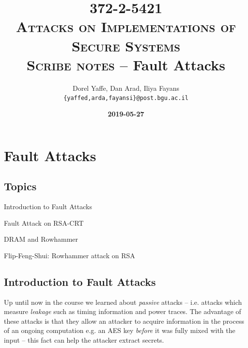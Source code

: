 \chapter{Fault Attacks} \label{c9_ninthchapter:cha}

\makeatletter
\let\oldabs\abs
\def\abs{\@ifstar{\oldabs}{\oldabs*}}
%
\let\oldnorm\norm
\def\norm{\@ifstar{\oldnorm}{\oldnorm*}}
\makeatother

\title{
    {\large 372-2-5421} \\
    {\large \textsc{Attacks on Implementations of Secure Systems}} \\
    \vspace{20pt}
    \textbf{\textsc{Scribe notes} -- Fault Attacks}
}
\author{
    \parbox{\linewidth}{\centering
    Dorel Yaffe, Dan Arad, Iliya Fayans \\
    \vspace{7pt}\texttt{\small{\{yaffed,arda,fayansi\}@post.bgu.ac.il}}
    }
}
\date{\footnotesize{\textbf{2019-05-27}}}

\maketitle

\begin{centering}
    \section*{Topics}
        \begin{enumerate}
            \begin{centering}
            	\item Introduction to Fault Attacks
            	\item Fault Attack on RSA-CRT
            	\item DRAM and Rowhammer
            	\item Flip-Feng-Shui: Rowhammer attack on RSA \\
            \end{centering}
        \end{enumerate}
\end{centering}
\newpage
\section*{Introduction to Fault Attacks}
Up until now in the course we learned about \emph{passive} attacks -- i.e. attacks which measure \emph{leakage} such as timing information and power traces. The advantage of these attacks is that they allow an attacker to acquire information in the process of an ongoing computation e.g. an AES key \emph{before} it was fully mixed with the input -- this fact can help the attacker extract secrets.

